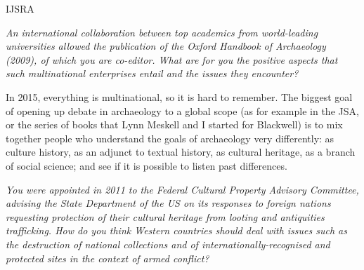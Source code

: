 \begin{labeling}{IJSRA}
\item[IJSRA] \emph{An international collaboration between top academics from world-leading universities allowed the publication of the \emph{Oxford Handbook of Archaeology} (2009), of which you are co-editor. What are for you the positive aspects that such multinational enterprises entail and the issues they encounter?}

\item[RAJ] In 2015, everything is multinational, so it is hard to remember. 
The biggest goal of opening up debate in archaeology to a global scope (as for example in the JSA, or the series of books that Lynn Meskell and I started for Blackwell) is to mix together people who understand the goals of archaeology very differently: as culture history, as an adjunct to textual history, as cultural heritage, as a branch of social science; and see if it is possible to listen past differences.

\item[IJSRA] \emph{You were appointed in 2011 to the Federal Cultural Property Advisory Committee, advising the State Department of the US on its responses to foreign nations requesting protection of their cultural heritage from looting and antiquities trafficking. How do you think Western countries should deal with issues such as the destruction of national collections and of internationally-recognised and protected sites in the context of armed conflict?}


\end{labeling}
